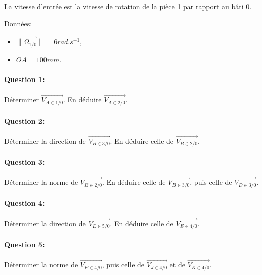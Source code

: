 La vitesse d'entrée est la vitesse de rotation de la pièce 1 par rapport au bâti 0. 

Données:
\begin{itemize}
 \item $\|\overrightarrow{\Omega_{1/0}}\|=6 rad.s^{-1}$,
 \item $OA = 100mm$.
\end{itemize}

\paragraph{Question 1:} Déterminer $\overrightarrow{V_{A \in 1/0}}$. En déduire $\overrightarrow{V_{A \in 2/0}}$.

\paragraph{Question 2:} Déterminer la direction de $\overrightarrow{V_{B \in 3/0}}$. En déduire celle de $\overrightarrow{V_{B \in 2/0}}$.

\paragraph{Question 3:} Déterminer la norme de $\overrightarrow{V_{B \in 2/0}}$. En déduire celle de $\overrightarrow{V_{B \in 3/0}}$, puis celle de $\overrightarrow{V_{D \in 3/0}}$.

\paragraph{Question 4:} Déterminer la direction de $\overrightarrow{V_{E \in 5/0}}$. En déduire celle de $\overrightarrow{V_{E \in 4/0}}$.

\paragraph{Question 5:} Déterminer la norme de $\overrightarrow{V_{E \in 4/0}}$, puis celle de $\overrightarrow{V_{J \in 4/0}}$ et de $\overrightarrow{V_{K \in 4/0}}$.

\newpage

